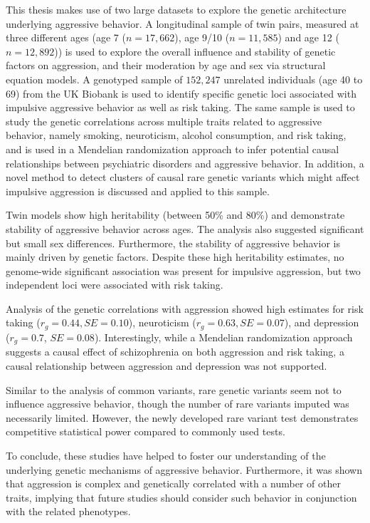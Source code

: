 \documentclass[header.tex]{subfiles}
\begin{document}
This thesis makes use of two large datasets to explore the genetic architecture underlying aggressive behavior.
A longitudinal sample of twin pairs, measured at three different ages (age 7 ($n=17,662$), age 9/10 ($n=11,585$) and age 12 ($n=12,892$)) is used to explore the overall influence and stability of genetic factors on aggression, and their moderation by  age and sex  via structural equation models.
A genotyped sample of $152,247$ unrelated individuals (age 40 to 69) from the UK Biobank is used to identify specific genetic loci associated with impulsive aggressive behavior as well as risk taking.
The same sample is  used to study the genetic correlations across multiple traits related to aggressive behavior, namely smoking, neuroticism, alcohol consumption, and risk taking, and is used in a Mendelian randomization approach to infer potential causal relationships between psychiatric disorders and aggressive behavior.
In addition, a novel method to detect clusters of causal rare genetic variants which might affect impulsive aggression is discussed and applied to this sample. 

Twin models show high heritability (between 50\% and 80\%) and demonstrate stability of aggressive behavior across ages.
The analysis also suggested significant but small sex differences.
Furthermore, the stability of aggressive behavior is mainly driven by genetic factors.
Despite these high heritability estimates, no genome-wide significant association was present for impulsive aggression, but two independent loci were associated with risk taking.

Analysis of the genetic correlations with aggression showed high estimates for risk taking ($r_g=0.44, SE=0.10$), neuroticism ($r_g=0.63, SE=0.07$), and depression ($r_g=0.7$, $SE=0.08$).
Interestingly, while a Mendelian randomization approach suggests a causal effect of schizophrenia on both aggression and risk taking, a causal relationship between aggression and depression was not supported.

Similar to the analysis of common variants, rare genetic variants seem not to influence aggressive behavior, though the number of rare variants imputed was necessarily limited.
However, the newly developed rare variant test demonstrates competitive statistical power compared to commonly used tests.

To conclude, these studies have helped to foster our understanding of the underlying genetic mechanisms of aggressive behavior.
Furthermore, it was shown that aggression is complex and genetically correlated with a number of other traits,
implying that future studies should consider  such behavior in conjunction with the related phenotypes.     
\end{document}
